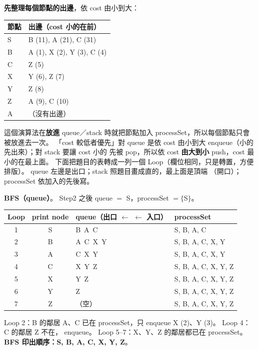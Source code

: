 \begin{pastsoln}
\textbf{先整理每個節點的出邊}，依 cost 由小到大：
\begin{center}
\small
\begin{tabular}{ll}
\toprule
節點 & 出邊（cost 小的在前） \\
\midrule
S & B (11), A (21), C (31) \\
B & A (1), X (2), Y (3), C (4) \\
C & Z (5) \\
X & Y (6), Z (7) \\
Y & Z (8) \\
Z & A (9), C (10) \\
A & （沒有出邊） \\
\bottomrule
\end{tabular}
\end{center}
這個演算法在\textbf{放進} queue／stack 時就把節點加入 processSet，所以每個節點只會被放進去一次。
「cost 較低者優先」對 queue 是依 cost 由小到大 enqueue（小的先出來）；對 stack 要讓 cost 小的
先被 pop，所以依 cost \textbf{由大到小} push，cost 最小的在最上面。 下面把題目的表轉成一列一個
Loop（欄位相同，只是轉置，方便排版）。 queue 左邊是出口；stack 照題目畫成直的，最上面是頂端
（開口）；processSet 依加入的先後寫。

\textbf{BFS（queue）}。 Step2 之後 queue $=$ S，processSet $= \{$S$\}$。
\begin{center}
\small
\begin{tabular}{cclp{4.2cm}}
\toprule
Loop & print node & queue（出口 $\leftarrow$ \quad $\leftarrow$ 入口） & processSet \\
\midrule
1 & S & B\ A\ C & S, B, A, C \\
2 & B & A\ C\ X\ Y & S, B, A, C, X, Y \\
3 & A & C\ X\ Y & S, B, A, C, X, Y \\
4 & C & X\ Y\ Z & S, B, A, C, X, Y, Z \\
5 & X & Y\ Z & S, B, A, C, X, Y, Z \\
6 & Y & Z & S, B, A, C, X, Y, Z \\
7 & Z & （空） & S, B, A, C, X, Y, Z \\
\bottomrule
\end{tabular}
\end{center}
Loop 2：B 的鄰居 A、C 已在 processSet，只 enqueue X (2)、Y (3)。 Loop 4：C 的鄰居 Z 不在，
enqueue。 Loop 5--7：X、Y、Z 的鄰居都已在 processSet。 \textbf{BFS 印出順序：S, B, A, C, X, Y, Z}。


\end{pastsoln}
